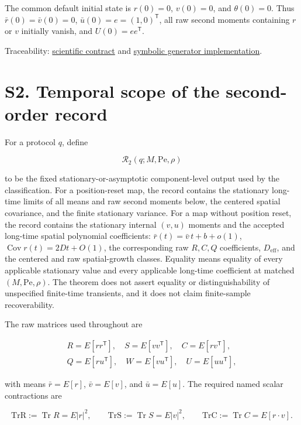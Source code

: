 The common default initial state is \(r(0)=0\), \(v(0)=0\), and \(\theta(0)=0\). Thus \(\bar r(0)=\bar v(0)=0\), \(\bar u(0)=e=(1,0)^\mathsf T\), all raw second moments containing \(r\) or \(v\) initially vanish, and \(U(0)=ee^\mathsf T\).

Traceability: \href{https://github.com/blakepi/phasemap-reproducibility/blob/v3.1.1/docs/scientific-contract/CONTRACT.md}{scientific contract} and \href{https://github.com/blakepi/phasemap-reproducibility/blob/v3.1.1/src/phasemap/theory/generator.py}{symbolic generator implementation}.

\section{S2. Temporal scope of the second-order record}\label{s2.-temporal-scope-of-the-second-order-record}

For a protocol \(q\), define

\[
\mathcal R_2(q;M,\mathrm{Pe},\rho)
\]

to be the fixed stationary-or-asymptotic component-level output used by the classification. For a position-reset map, the record contains the stationary long-time limits of all means and raw second moments below, the centered spatial covariance, and the finite stationary variance. For a map without position reset, the record contains the stationary internal \((v,u)\) moments and the accepted long-time spatial polynomial coefficients: \(\bar r(t)=\bar v\,t+b+o(1)\), \(\operatorname{Cov}r(t)=2Dt+O(1)\), the corresponding raw \(R,C,Q\) coefficients, \(D_{\mathrm{eff}}\), and the centered and raw spatial-growth classes. Equality means equality of every applicable stationary value and every applicable long-time coefficient at matched \((M,\mathrm{Pe},\rho)\). The theorem does not assert equality or distinguishability of unspecified finite-time transients, and it does not claim finite-sample recoverability.

The raw matrices used throughout are

\[
\begin{gathered}
R=E[rr^\mathsf T],\quad S=E[vv^\mathsf T],\quad
C=E[rv^\mathsf T],\\
Q=E[ru^\mathsf T],\quad W=E[vu^\mathsf T],\quad
U=E[uu^\mathsf T],
\end{gathered}
\]

with means \(\bar r=E[r]\), \(\bar v=E[v]\), and \(\bar u=E[u]\). The required named scalar contractions are

\[
\mathrm{TrR}:=\operatorname{Tr}R=E|r|^2,\qquad
\mathrm{TrS}:=\operatorname{Tr}S=E|v|^2,\qquad
\mathrm{TrC}:=\operatorname{Tr}C=E[r\mathbin{\cdot}v].
\]

